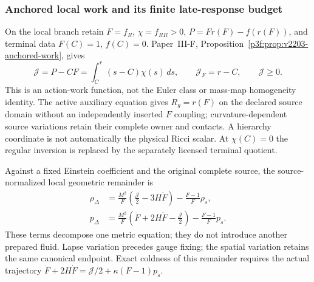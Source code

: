 \documentclass[12pt,a4paper]{article}
\begin{document}
\subsubsection{Anchored local work and its finite late-response budget}
On the local branch retain $F=f_R$, $\chi=f_{RR}>0$,
$P=Fr(F)-f(r(F))$, and terminal data $F(C)=1$, $f(C)=0$.
Paper~III-F, Proposition~\ref{p3f:prop:v2203-anchored-work}, gives
\begin{equation}
\label{p8:eq:v2203-anchored-local-work}
 \mathcal J=P-CF=\int_C^r(s-C)\chi(s)\,ds,\qquad
 \mathcal J_F=r-C,\qquad \mathcal J\ge0.
\end{equation}
This is an action-work function, not the Euler class or mass-map
homogeneity identity. The active auxiliary equation gives $R_g=r(F)$
on the declared source domain without an independently inserted $F$
coupling; curvature-dependent source variations retain their complete
owner and contacts. A hierarchy coordinate is not automatically the
physical Ricci scalar. At $\chi(C)=0$ the regular inversion is replaced
by the separately licensed terminal quotient.

Against a fixed Einstein coefficient and the original complete source,
the source-normalized local geometric remainder is
\begin{align}
\label{p8:eq:v2203-local-source-normalized-remainder}
 \rho_\Delta&=\frac{M^2}{F}
       \left(\frac{\mathcal J}2-3H\dot F\right)
       -\frac{F-1}{F}\rho_s,\\
 p_\Delta&=\frac{M^2}{F}
       \left(\ddot F+2H\dot F-\frac{\mathcal J}2\right)
       -\frac{F-1}{F}p_s.\nonumber
\end{align}
These terms decompose one metric equation; they do not introduce
another prepared fluid. Lapse variation precedes gauge fixing; the
spatial variation retains the same canonical endpoint.
Exact coldness of this remainder requires the actual trajectory
$\ddot F+2H\dot F=\mathcal J/2+\kappa(F-1)p_s$.
\end{document}
